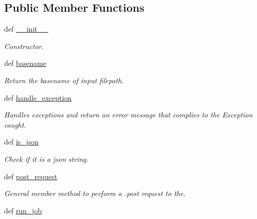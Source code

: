 \subsection*{Public Member Functions}
\begin{DoxyCompactItemize}
\item 
def \hyperlink{classRappCloud_1_1ServiceController_1_1ServiceControllerBase_1_1ServiceControllerBase_ae88d9e011ea1564c2f24984959bb75f7}{\-\_\-\-\_\-init\-\_\-\-\_\-}
\begin{DoxyCompactList}\small\item\em Constructor. \end{DoxyCompactList}\item 
def \hyperlink{classRappCloud_1_1ServiceController_1_1ServiceControllerBase_1_1ServiceControllerBase_a38b601cc90b65004cfff9939ab8906dc}{basename}
\begin{DoxyCompactList}\small\item\em Return the basename of input filepath. \end{DoxyCompactList}\item 
def \hyperlink{classRappCloud_1_1ServiceController_1_1ServiceControllerBase_1_1ServiceControllerBase_a9f61ae2c557e155eb12983421f225c08}{handle\-\_\-exception}
\begin{DoxyCompactList}\small\item\em Handles exceptions and return an error message that complies to the Exception caught. \end{DoxyCompactList}\item 
def \hyperlink{classRappCloud_1_1ServiceController_1_1ServiceControllerBase_1_1ServiceControllerBase_a81715dbf8dc123500d5c9e8141f8ba0c}{is\-\_\-json}
\begin{DoxyCompactList}\small\item\em Check if it is a json string. \end{DoxyCompactList}\item 
def \hyperlink{classRappCloud_1_1ServiceController_1_1ServiceControllerBase_1_1ServiceControllerBase_ac01dccda26fb7460492c869a9af8eb5f}{post\-\_\-request}
\begin{DoxyCompactList}\small\item\em General member method to perform a .post request to the. \end{DoxyCompactList}\item 
def \hyperlink{classRappCloud_1_1ServiceController_1_1ServiceControllerBase_1_1ServiceControllerBase_a0ef5174b6c645896d5da8fb334fc851c}{run\-\_\-job}
\end{DoxyCompactItemize}
